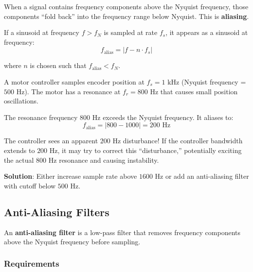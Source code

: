 When a signal contains frequency components above the Nyquist frequency, those components ``fold back'' into the frequency range below Nyquist. This is \textbf{aliasing}.

If a sinusoid at frequency $f > f_N$ is sampled at rate $f_s$, it appears as a sinusoid at frequency:
\begin{equation}
f_{\text{alias}} = |f - n \cdot f_s|
\label{eq:alias_freq}
\end{equation}

where $n$ is chosen such that $f_{\text{alias}} < f_N$.

\begin{example}
\label{ex:aliasing_motor}

A motor controller samples encoder position at $f_s = 1\text{ kHz}$ (Nyquist frequency = $500\text{ Hz}$). The motor has a resonance at $f_r = 800\text{ Hz}$ that causes small position oscillations.

The resonance frequency $800\text{ Hz}$ exceeds the Nyquist frequency. It aliases to:
\begin{equation}
f_{\text{alias}} = |800 - 1000| = 200\text{ Hz}
\end{equation}

The controller sees an apparent $200\text{ Hz}$ disturbance! If the controller bandwidth extends to $200\text{ Hz}$, it may try to correct this ``disturbance,'' potentially exciting the actual $800\text{ Hz}$ resonance and causing instability.

\textbf{Solution}: Either increase sample rate above $1600\text{ Hz}$ or add an anti-aliasing filter with cutoff below $500\text{ Hz}$.
\end{example}


\subsection{Anti-Aliasing Filters}

An \textbf{anti-aliasing filter} is a low-pass filter that removes frequency components above the Nyquist frequency before sampling.

\subsubsection{Requirements}

